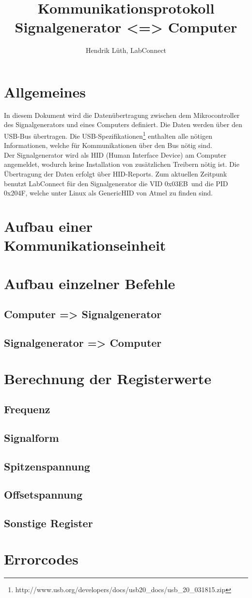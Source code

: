 \documentclass[a4paper,12pt]{article}
\title{Kommunikationsprotokoll \\Signalgenerator <=> Computer}
\author{Hendrik Lüth, LabConnect}
\newcommand{\VID}{0x03EB}
\newcommand{\PID}{0x204F}
\begin{document}
\maketitle
\tableofcontents
\pagebreak

\section{Allgemeines}
In diesem Dokument wird die Datenübertragung zwischen dem Mikrocontroller des Signalgenerators und eines Computers definiert. Die Daten werden über den USB-Bus übertragen. Die USB-Spezifikationen\footnote{http://www.usb.org/developers/docs/usb20\_docs/usb\_20\_031815.zip} enthalten alle nötigen Informationen, welche für Kommunikationen über den Bus nötig sind.\\
Der Signalgenerator wird als HID (Human Interface Device) am Computer angemeldet, wodurch keine Installation von zusätzlichen Treibern nötig ist. Die Übertragung der Daten erfolgt über HID-Reports. Zum aktuellen Zeitpunk benutzt LabConnect für den Signalgenerator die VID \VID\ und die PID \PID, welche unter Linux als GenericHID von Atmel zu finden sind.\\




\section{Aufbau einer Kommunikationseinheit}
\section{Aufbau einzelner Befehle}
\subsection{Computer => Signalgenerator}
\subsection{Signalgenerator => Computer}
\section{Berechnung der Registerwerte}
\subsection{Frequenz}
\subsection{Signalform}
\subsection{Spitzenspannung}
\subsection{Offsetspannung}
\subsection{Sonstige Register}
\section{Errorcodes}
\end{document}
